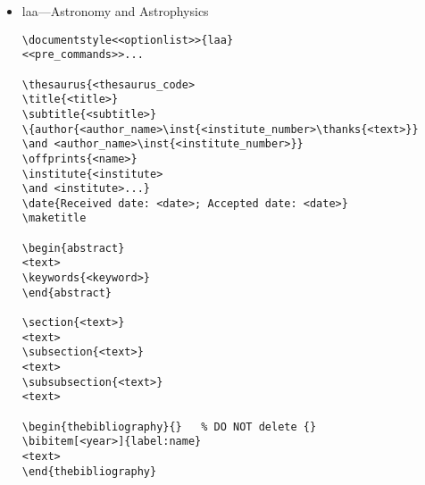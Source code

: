 \begin{itemize}
\begin{small}
\begin{verbatim}
\begin{titlepage}
\maketitle
\end{titlepage}

\cleardoublepage
%
% Page 1 reserved for revision history page
%
\setcounter{page}{2}
\tableofcontents
\newpage

% Since all bookform documents don't necessarily follow the same
% section structure, the author must layout the document as desired.


\end{verbatim}
\end{small}

\item laa---Astronomy and Astrophysics

\begin{small}
\begin{verbatim}
\documentstyle<<optionlist>>{laa}
<<pre_commands>>...

\thesaurus{<thesaurus_code>
\title{<title>}
\subtitle{<subtitle>}
\{author{<author_name>\inst{<institute_number>\thanks{<text>}} 
\and <author_name>\inst{<institute_number>}}
\offprints{<name>}
\institute{<institute> 
\and <institute>...}
\date{Received date: <date>; Accepted date: <date>}
\maketitle

\begin{abstract}
<text>
\keywords{<keyword>}
\end{abstract}

\section{<text>}
<text>
\subsection{<text>}
<text>
\subsubsection{<text>}
<text>

\begin{thebibliography}{}	% DO NOT delete {}
\bibitem[<year>]{label:name}
<text>
\end{thebibliography}



\end{verbatim}
\end{small}
\end{itemize}
